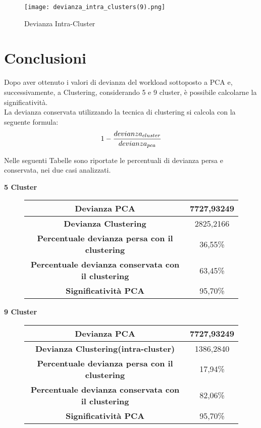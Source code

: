 \begin{figure}[!htbp]
  \centering
	\texttt{[image: devianza\_intra\_clusters(9).png]}
  \caption{Devianza Intra-Cluster}
  \label{}
\end{figure}
\clearpage
\section{Conclusioni}

Dopo aver ottenuto i valori di devianza del workload sottoposto a PCA e, successivamente,
a Clustering, considerando 5 e 9 cluster, è possibile calcolarne la significatività.\\
La devianza conservata utilizzando la tecnica di clustering si calcola con la
seguente formula:
$$1-{devianza_{cluster}\over {devianza_{pca}}}$$

Nelle seguenti Tabelle sono riportate le percentuali di devianza persa e conservata,
 nei due casi analizzati.\\
\vspace{5 mm}

\begin{center}
  \textbf{5 Cluster}
\end{center}
\begin{figure}[!htbp]
  \centering
  \begin{tabular}{|c|c|}
  \hline
  \textbf{Devianza PCA}	& 7727,93249 \\
  \hline
  \textbf{Devianza Clustering}	& 2825,2166 \\
  \hline
  \textbf{Percentuale devianza persa con il clustering}	& 36,55\% \\
  \hline
  \textbf{Percentuale devianza conservata con il clustering}	& 63,45\% \\
  \hline
  \textbf{Significatività PCA} &	95,70\% \\
  \hline
  \end{tabular}
\end{figure}


\vspace{5 mm}
\begin{center}
  \textbf{9 Cluster}
\end{center}
\begin{figure}[!htbp]
  \centering
  \begin{tabular}{|c|c|}
    \hline
    \textbf{Devianza PCA}	& 7727,93249 \\
    \hline
    \textbf{Devianza Clustering(intra-cluster)}	& 1386,2840 \\
    \hline
    \textbf{Percentuale devianza persa con il clustering}	& 17,94\% \\
    \hline
    \textbf{Percentuale devianza conservata con il clustering}	& 82,06\% \\
    \hline
    \textbf{Significatività PCA} &	95,70\% \\
    \hline
  \end{tabular}
\end{figure}

